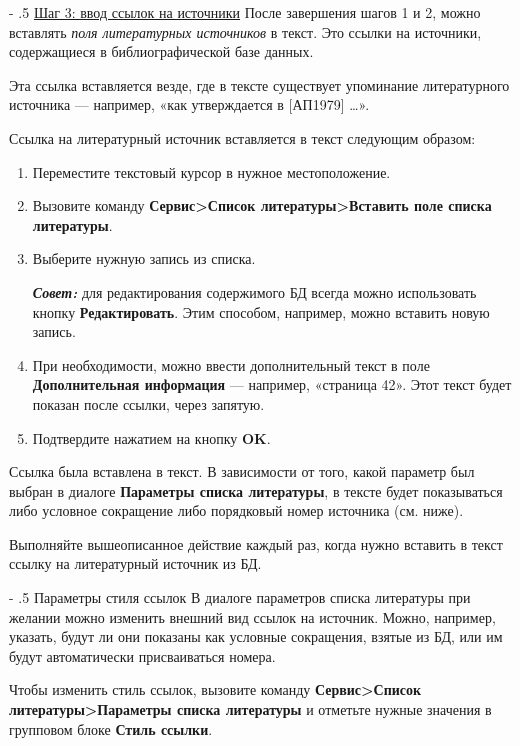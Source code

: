 ﻿\documentclass[a4paper,10pt]{article}
\makeatletter
\renewcommand\paragraph{%
   \@startsection{paragraph}{4}{0mm}%
      {-\baselineskip}%
      {.5\baselineskip}%
      {\normalfont\normalsize\bfseries}}
\makeatother
\begin{document}
\paragraph{\underline{Шаг 3: ввод ссылок на источники}}
После завершения шагов 1 и 2, можно вставлять \textit{поля литературных источников} в текст. Это ссылки на источники, содержащиеся в библиографической базе данных.

Эта ссылка вставляется везде, где в тексте существует упоминание литературного источника — например, «как утверждается в [АП1979] …».

Ссылка на литературный источник вставляется в текст следующим образом:
\begin{enumerate}
 \item Переместите текстовый курсор в нужное местоположение.
 \item Вызовите команду \textbf{Сервис>Список литературы>Вставить поле списка литературы}.
 \item Выберите нужную запись из списка.
 
 \textit{\textbf{Совет:}} для редактирования содержимого БД всегда можно использовать кнопку \textbf{Редактировать}. Этим способом, например, можно вставить новую запись.
 \item При необходимости, можно ввести дополнительный текст в поле \textbf{Дополнительная информация} — например, «страница 42». Этот текст будет показан после ссылки, через запятую.
 \item Подтвердите нажатием на кнопку \textbf{OK}.
\end{enumerate}

Ссылка была вставлена в текст. В зависимости от того, какой параметр был выбран в диалоге \textbf{Параметры списка литературы}, в тексте будет показываться либо условное сокращение либо порядковый номер источника (см. ниже).

Выполняйте вышеописанное действие каждый раз, когда нужно вставить в текст ссылку на литературный источник из БД.

\paragraph{Параметры стиля ссылок}
В диалоге параметров списка литературы при желании можно изменить внешний вид ссылок на источник. Можно, например, указать, будут ли они показаны как условные сокращения, взятые из БД, или им будут автоматически присваиваться номера.

Чтобы изменить стиль ссылок, вызовите команду \textbf{Сервис>Список литературы>Параметры списка литературы} и отметьте нужные значения в групповом блоке \textbf{Стиль ссылки}.
\end{document}
